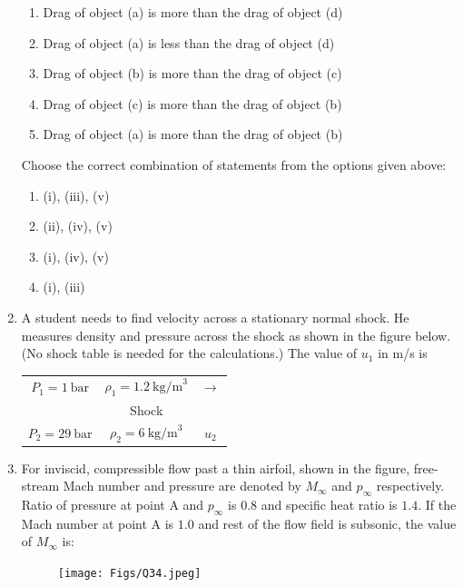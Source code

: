 \documentclass[journal]{IEEEtran}
\begin{document}
\begin{enumerate}
\begin{enumerate}[label=(\roman*)]
    \item Drag of object (a) is more than the drag of object (d)  
    \item Drag of object (a) is less than the drag of object (d)  
    \item Drag of object (b) is more than the drag of object (c)  
    \item Drag of object (c) is more than the drag of object (b)  
    \item Drag of object (a) is more than the drag of object (b)  
\end{enumerate}

Choose the correct combination of statements from the options given above:  
\begin{enumerate}
    \item (i), (iii), (v)
    \item (ii), (iv), (v)
    \item (i), (iv), (v)
    \item (i), (iii)
\end{enumerate}
\hfill{}


\item \quad A student needs to find velocity across a stationary normal shock. He measures density and pressure across the shock as shown in the figure below. (No shock table is needed for the calculations.) The value of $u_1$ in m/s is

\begin{center}
\begin{tabular}{c c c}
$P_1 = 1 \ \text{bar}$ & $\rho_1 = 1.2 \ \text{kg/m}^3$ & $\longrightarrow$ \\
& Shock & \\
$P_2 = 29 \ \text{bar}$ & $\rho_2 = 6 \ \text{kg/m}^3$ & $u_2$
\end{tabular}
\end{center}
\hfill{}

\item \quad For inviscid, compressible flow past a thin airfoil, shown in the figure, free-stream Mach number and pressure are denoted by $M_\infty$ and $p_\infty$ respectively. Ratio of pressure at point A and $p_\infty$ is $0.8$ and specific heat ratio is $1.4$. If the Mach number at point A is $1.0$ and rest of the flow field is subsonic, the value of $M_\infty$ is:

\begin{figure}[H]
\centering
\texttt{[image: Figs/Q34.jpeg]}
\caption{}
\end{figure}


\end{enumerate}
\end{document}
